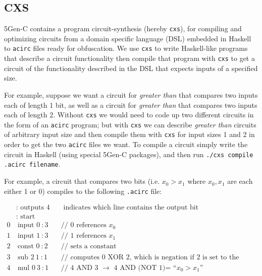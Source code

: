 \documentclass[12pt,twoside]{reedthesis}
\begin{document}
      \subsection{CXS}
   
   5Gen-C contains a program circuit-synthesis (hereby \texttt{cxs}), for compiling and optimizing circuits from a domain specific language (DSL) embedded in Haskell to \texttt{acirc} files ready for obfuscation. We use \texttt{cxs} to write Haskell-like programs that describe a circuit functionality then compile that program with \texttt{cxs} to get a circuit of the functionality described in the DSL that expects inputs of a specified size.
   \par For example, suppose we want a circuit for \textit{greater than} that compares two inputs each of length 1 bit, as well as a circuit for \textit{greater than} that compares two inputs each of length 2. Without \texttt{cxs} we would need to code up two different circuits in the form of an \texttt{acirc} program; but with \texttt{cxs} we can describe \textit{greater than} circuits of arbitrary input size and then compile them with \texttt{cxs} for input sizes 1 and 2 in order to get the two \texttt{acirc} files we want. To compile a circuit simply write the circuit in Haskell (using special 5Gen-C packages), and then run \texttt{./cxs compile .acirc filename}.
   \par For example, a circuit that compares two bits (i.e. $x_0 > x_1$ where $x_0,x_1$ are each either 1 or 0) compiles to the following \texttt{.acirc} file:
   
   \newcommand{\sub}[0]{\text{ sub }}
   \newcommand{\mul}[0]{\text{ mul }}
   
   \begin{align*}
  &\text{: outputs } 4 &&\text{ indicates which line contains the output bit} \\
  &\text{: start }  & \\
0&\ \text{input } 0\ : 3  &&\text{// 0 references $x_0$} \\
1&\ \text{input } 1\ : 3  &&\text{// 1 references $x_1$} \\
2&\ \text{const } 0\ : 2 &&\text{// sets a constant} \\
3&\ \text{sub } 2\ 1\ : 1 &&\text{// computes 0 XOR 2, which is negation if 2 is set to the value ``1''} \\
4&\ \text{mul } 0\ 3\ : 1 &&\text{// 4 AND 3 $\to$ 4 AND (NOT 1)= ``$x_0 >x_1$''} \\
   \end{align*} 
  
\end{document}
